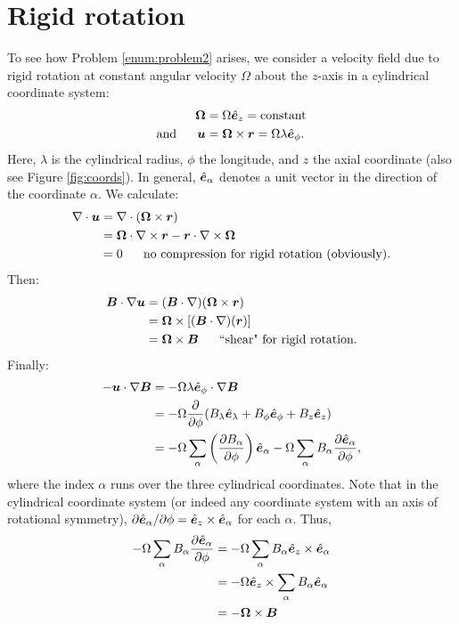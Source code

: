 \documentclass[12pt]{article}
\newcommand{\vecrot}{\bm{\Omega}}
\newcommand{\vecr}{\bm{r}}
\begin{document}
\section{Rigid rotation}
To see how Problem \ref{enum:problem2} arises, we consider a velocity field due to rigid rotation at constant angular velocity $\Omega$ about the $z$-axis in a cylindrical coordinate system:
\begin{subequations}
	\begin{align}
		\vecrot &= \Omega\ez=\text{constant}\\
		\andd \vecu&=\vecrot\times\bm{r} = \Omega\lambda\ep.
	\end{align}
\end{subequations}
Here, $\lambda$ is the cylindrical radius, $\phi$ the longitude, and $z$ the axial coordinate (also see Figure \ref{fig:coords}). In general,  $\hat{\bm{e}}_\alpha$ denotes a unit vector in the direction of the coordinate $\alpha$. We calculate:
\begin{align}
	\Div\vecu&=\Div(\vecrot\times\bm{r})\nonumber\\
	&= \vecrot\dotgrad\times\vecr-\vecr\dotgrad\times\vecrot\nonumber\\
	&= 0\five\text{no compression for rigid rotation (obviously).}
\end{align}
Then:
\begin{align}
	\vecb\dotgrad\vecu&=(\vecb\dotgrad)(\vecrot\times\vecr)\nonumber\nonumber\\
	&= \vecrot\times[(\vecb\dotgrad)(\vecr)]\\
	&= \vecrot\times\vecb\five\text{``shear" for rigid rotation}.
\end{align}
Finally:
\begin{align*}
	-\bm{u}\cdot\nabla\bm{B} &= -\Omega\lambda\hat{\bm{e}}_\phi\cdot\nabla\bm{B}\\
	&=-\Omega\frac{\partial}{\partial\phi}(B_\lambda\hat{\bm{e}}_\lambda+B_\phi\hat{\bm{e}}_\phi+B_z\hat{\bm{e}}_z)\\
	&=-\Omega\sum_\alpha\left(\frac{\partial B_\alpha}{\partial\phi}\right)\hat{\bm{e}}_\alpha-\Omega\sum_\alpha B_\alpha\frac{\partial\hat{\bm{e}}_\alpha}{\partial\phi},
\end{align*}
where the index $\alpha$ runs over the three cylindrical coordinates. Note that in the cylindrical coordinate system (or indeed any coordinate system with an axis of rotational symmetry), $\partial\hat{\bm{e}}_\alpha/\partial\phi=\hat{\bm{e}}_z\times\hat{\bm{e}}_\alpha$ for each $\alpha$. Thus,
\begin{align*}
	-\Omega\sum_\alpha B_\alpha\pderiv{\e_\alpha}{\phi} &= -\Omega\sum_\alpha B_\alpha\ez\times\e_\alpha\\
	&=-\Omega\ez\times\sum_\alpha B_\alpha\e_\alpha\\
	&=-\vecrot\times\vecb
\end{align*}
\end{document}
